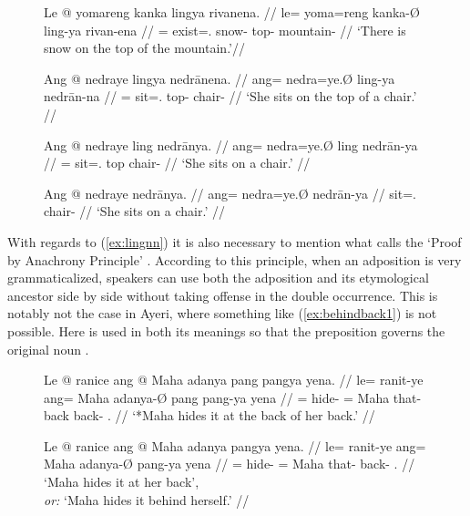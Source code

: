 \begin{figure}[h]
\pex
\a\label{ex:lingnn}\begingl
	\gla Le @ yomareng kanka lingya rivanena. //
	\glb le= yoma=reng kanka-Ø ling-ya rivan-ena //
	\glc \PatTI{}= exist=\TsgI{}.\Aarg{} snow-\Top{} top-\Loc{}
		mountain-\Gen{} //
	\glft `There is snow on the top of the mountain.'\footnotemark //
\endgl

\a\label{ex:lingpr}\ljudge* \begingl
	\gla Ang @ nedraye lingya nedrānena. //
	\glb ang= nedra=ye.Ø ling-ya nedrān-na //
	\glc \AgtT{}= sit=\TsgF{}.\Top{} top-\Loc{} chair-\Gen{} //
	\glft `\ques{}She sits on the top of a chair.' //
\endgl
\xe
\end{figure}


\begin{figure}[h]
\pex
\a\label{ex:lingpp}\begingl
	\gla Ang @ nedraye ling nedrānya. //
	\glb ang= nedra=ye.Ø ling nedrān-ya //
	\glc \AgtT{}= sit=\TsgF{}.\Top{} top chair-\Loc{} //
	\glft `She sits on a chair.' //
\endgl

\a\label{ex:prepunderspec}%
\begingl
	\gla Ang @ nedraye nedrānya. //
	\glb ang= nedra=ye.Ø nedrān-ya //
	\glc \AgtT{} sit=\TsgF{}.\Top{} chair-\Loc{} //
	\glft `She sits on a chair.' //
\endgl\xe
\end{figure}

With regards to (\ref{ex:lingnn}) it is also necessary to mention what
\citet{hagege2010} calls the `Proof by Anachrony Principle'
\citep[158--159]{hagege2010}. According to this principle, when an adposition
is very grammaticalized, speakers can use both the adposition and its
etymological ancestor side by side without taking offense in the double
occurrence. This is notably not the case in Ayeri, where something like
(\ref{ex:behindback1}) is not possible. Here  is used in both
its meanings so that the preposition  governs the
original noun .

\begin{figure}[h]
\pex
\a\label{ex:behindback1}\ljudge* \begingl
	\gla Le @ ranice ang @ Maha adanya pang pangya yena. //
	\glb le= ranit-ye ang= Maha adanya-Ø pang pang-ya yena //
	\glc \PatTI{}= hide-\TsgF{} \Aarg{}= Maha that-\Top{} back back-\Loc{} 
		\TsgF{}.\Gen{} //
	\glft `*Maha hides it at the back of her back.' //
\endgl

\a\label{ex:behindback2}\begingl
	\gla Le @ ranice ang @ Maha adanya pangya yena. //
	\glb le= ranit-ye ang= Maha adanya-Ø pang-ya yena //
	\glc \PatTI{}= hide-\TsgF{} \Aarg{}= Maha that-\Top{} back-\Loc{} 
		\TsgF{}.\Gen{} //
	\glft `Maha hides it at her back',\\
		\textit{or:} `Maha hides it behind herself.' //
\endgl
\xe
\end{figure}


